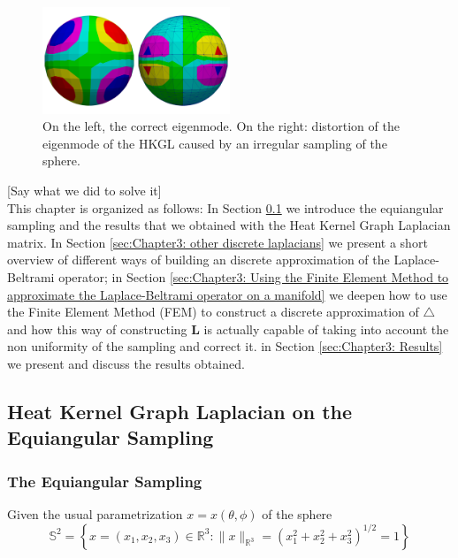 \begin{figure}
	\label{fig:equiangular distortion}
	\begin{center}
			\includegraphics[width=0.5\textwidth]{../codes/04.imbalanced/img/confront_mixed.png}
	\end{center}
	\caption{On the left, the correct eigenmode. On the right: distortion of the eigenmode of the HKGL caused by an irregular sampling of the sphere.}
\end{figure}

[Say what we did to solve it]\\
This chapter is organized as follows: In Section \ref{sec:Chapter3: Heat Kernel Graph Laplacian on the Equiangular Sampling} we introduce the equiangular sampling and the results that we obtained with the Heat Kernel Graph Laplacian matrix. In Section \ref{sec:Chapter3: other discrete laplacians} we present a short overview of different ways of building an discrete approximation of the Laplace-Beltrami operator; in Section \ref{sec:Chapter3: Using the Finite Element Method to approximate the Laplace-Beltrami operator on a manifold} we deepen how to use the Finite Element Method (FEM) to construct a discrete approximation of $\triangle$ and how this way of constructing $\mathbf L$  is actually capable of taking into account the non uniformity of the sampling and correct it. in Section \ref{sec:Chapter3: Results} we present and discuss the results obtained.
\subsection{Heat Kernel Graph Laplacian on the Equiangular Sampling}
\label{sec:Chapter3: Heat Kernel Graph Laplacian on the Equiangular Sampling}

\subsubsection{The Equiangular Sampling}

Given the usual parametrization $x = x(\theta, \phi)$ of the sphere
$$
\mathbb{S}^{2}=\left\{x=\left(x_{1}, x_{2}, x_{3}\right) \in \mathbb{R}^{3} :\|x\|_{\mathbb{R}^{3}}=\left(x_{1}^{2}+x_{2}^{2}+x_{3}^{2}\right)^{1 / 2}=1\right\}
$$

